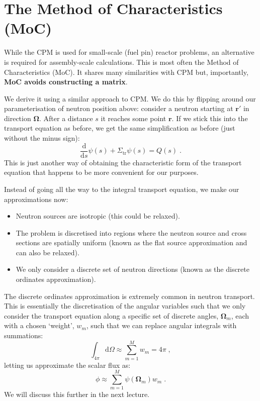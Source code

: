 \documentclass{article}
\begin{document}
\section{The Method of Characteristics (MoC)}

While the CPM is used for small-scale (fuel pin) reactor problems, an alternative is required for assembly-scale calculations. This is most often the Method of Characteristics (MoC). It shares many similarities with CPM but, importantly, \textbf{MoC avoids constructing a matrix}.

We derive it using a similar approach to CPM. We do this by flipping around our parameterisation of neutron position above: consider a neutron starting at $\mathbf{r}'$ in direction $\mathbf{\Omega}$. After a distance $s$ it reaches some point $\mathbf{r}$. If we stick this into the transport equation as before, we get the same simplification as before (just without the minus sign):
\begin{equation}
    \frac{\mathrm{d}}{\mathrm{d}s}\psi(s) + \Sigma_\mathrm{tr}\psi(s) = Q(s)\;\mathrm{.}
\end{equation}
This is just another way of obtaining the characteristic form of the transport equation that happens to be more convenient for our purposes.

Instead of going all the way to the integral transport equation, we make our approximations now:
\begin{itemize}
    \item Neutron sources are isotropic (this could be relaxed).
    \item The problem is discretised into regions where the neutron source and cross sections are spatially uniform (known as the flat source approximation and can also be relaxed).
    \item We only consider a discrete set of neutron directions (known as the discrete ordinates approximation).
\end{itemize}

The discrete ordinates approximation is extremely common in neutron transport. This is essentially the discretisation of the angular variables such that we only consider the transport equation along a specific set of discrete angles, $\mathbf{\Omega}_m$, each with a chosen `weight', $w_m$, such that we can replace angular integrals with summations:
\begin{equation}
	\int_{4\pi}\mathrm{d}\Omega \approx \sum^M_{m = 1} w_m = 4\pi\;\mathrm{,} 
\end{equation}
letting us approximate the scalar flux as:
\begin{equation}
	\phi \approx \sum^M_{m=1} \psi(\mathbf{\Omega}_m)w_m\;\mathrm{.}
\end{equation}
We will discuss this further in the next lecture.
\end{document}
